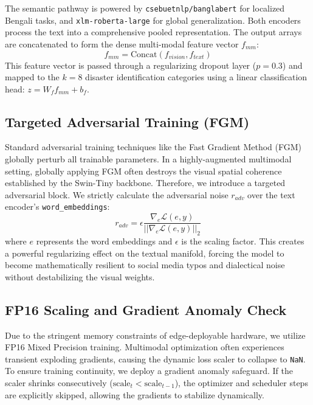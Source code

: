 \documentclass[twoside,twocolumn,10pt]{article}
\begin{document}
The semantic pathway is powered by \texttt{csebuetnlp/banglabert} \cite{banglabert} for localized Bengali tasks, and \texttt{xlm-roberta-large} \cite{xlmr} for global generalization. Both encoders process the text into a comprehensive pooled representation. The output arrays are concatenated to form the dense multi-modal feature vector $f_{mm}$:
\begin{equation}
    f_{mm} = \text{Concat}(f_{vision}, f_{text})
\end{equation}
This feature vector is passed through a regularizing dropout layer ($p=0.3$) and mapped to the $k=8$ disaster identification categories using a linear classification head: $z = W_f f_{mm} + b_f$.

\subsection{Targeted Adversarial Training (FGM)}
Standard adversarial training techniques like the Fast Gradient Method (FGM) \cite{fgm} globally perturb all trainable parameters. In a highly-augmented multimodal setting, globally applying FGM often destroys the visual spatial coherence established by the Swin-Tiny backbone. Therefore, we introduce a targeted adversarial block. We strictly calculate the adversarial noise $r_{adv}$ over the text encoder's \texttt{word\_embeddings}:
\begin{equation}
    r_{adv} = \epsilon \frac{\nabla_e \mathcal{L}(e, y)}{||\nabla_e \mathcal{L}(e, y)||_2}
\end{equation}
where $e$ represents the word embeddings and $\epsilon$ is the scaling factor. This creates a powerful regularizing effect on the textual manifold, forcing the model to become mathematically resilient to social media typos and dialectical noise without destabilizing the visual weights.

\subsection{FP16 Scaling and Gradient Anomaly Check}
Due to the stringent memory constraints of edge-deployable hardware, we utilize FP16 Mixed Precision training. Multimodal optimization often experiences transient exploding gradients, causing the dynamic loss scaler to collapse to \texttt{NaN}. To ensure training continuity, we deploy a gradient anomaly safeguard. If the scaler shrinks consecutively ($\text{scale}_{t} < \text{scale}_{t-1}$), the optimizer and scheduler steps are explicitly skipped, allowing the gradients to stabilize dynamically.
\end{document}
